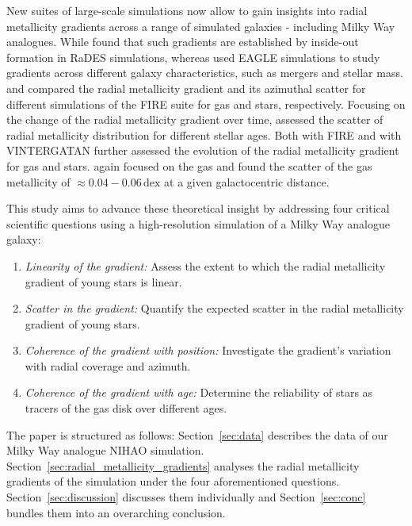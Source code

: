 \documentclass[fleqn,usenatbib]{mnras}
\begin{document}
New suites of large-scale simulations now allow to gain insights into radial metallicity gradients across a range of simulated galaxies - including Milky Way analogues. While \citet{Pilkington2012} found that such gradients are established by inside-out formation in RaDES simulations, whereas \citet{Tissera2019} used EAGLE simulations to study gradients across different galaxy characteristics, such as mergers and stellar mass. \citet{Bellardini2021} and \citet{Bellardini2022, Graf2024} compared the radial metallicity gradient and its azimuthal scatter for different simulations of the FIRE suite for gas and stars, respectively. Focusing on the change of the radial metallicity gradient over time, \citet{Grand2015} assessed the scatter of radial metallicity distribution for different stellar ages. Both \citet[][see their Fig. 6]{Ma2017} with FIRE and \citet[see their Fig. 9][]{Agertz2021} with VINTERGATAN further assessed the evolution of the radial metallicity gradient for gas and stars. \citet{Khoperskov2023e} again focused on the gas and found the scatter of the gas metallicity of $\approx 0.04-0.06\,\mathrm{dex}$ at a given galactocentric distance.

This study aims to advance these theoretical insight by addressing four critical scientific questions using a high-resolution simulation of a Milky Way analogue galaxy:
\begin{enumerate}
\item \textit{Linearity of the gradient:} Assess the extent to which the radial metallicity gradient of young stars is linear.
\item \textit{Scatter in the gradient:} Quantify the expected scatter in the radial metallicity gradient of young stars.
\item \textit{Coherence of the gradient with position:} Investigate the gradient's variation with radial coverage and azimuth.
\item \textit{Coherence of the gradient with age:} Determine the reliability of stars as tracers of the gas disk over different ages.
\end{enumerate}

The paper is structured as follows: Section~\ref{sec:data} describes the data of our Milky Way analogue NIHAO simulation. Section~\ref{sec:radial_metallicity_gradients} analyses the radial metallicity gradients of the simulation under the four aforementioned questions. Section~\ref{sec:discussion} discusses them individually and Section~\ref{sec:conc} bundles them into an overarching conclusion.
\end{document}
